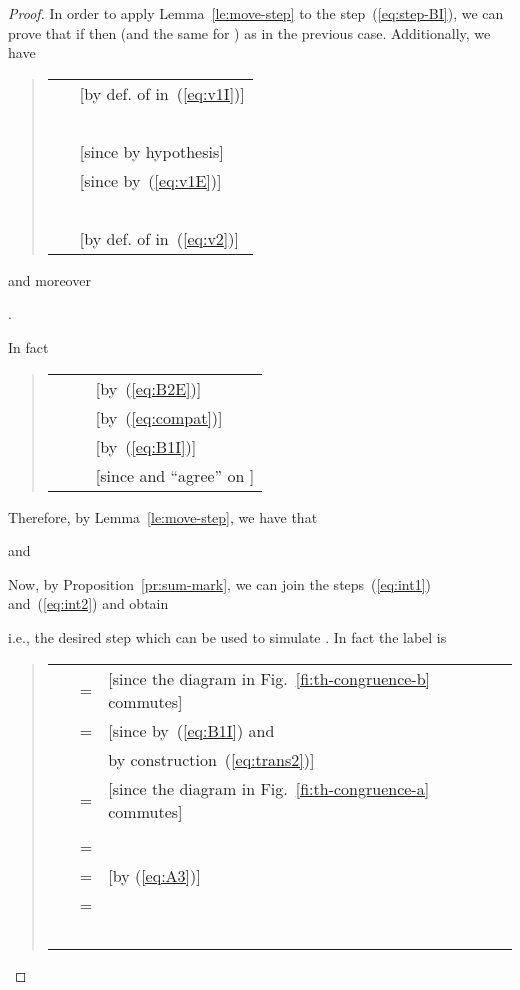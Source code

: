 \documentclass{LMCS}
\begin{document}
\begin{proof}
  
  In order to apply Lemma~\ref{le:move-step} to the
  step~(\ref{eq:step-BI}), we can prove that if  then
   (and the same for ) as in the previous case.
Additionally, we have
  \begin{quote}
    \begin{tabular}{ll}
       & 
      [by def. of  in~(\ref{eq:v1I})]\\
\ \quad  & \\
\ \quad  &
      [since   by hypothesis]\\
\ \quad  &
      [since   by~(\ref{eq:v1E})]\\
\ \quad  &\\
\ \quad  &
      [by def. of  in~(\ref{eq:v2})]
    \end{tabular}
  \end{quote}
  and moreover
  \begin{center}
    .
  \end{center}
  In fact
  \begin{quote}
    \begin{tabular}{lll}
       & & 
      [by~(\ref{eq:B2E})]\\
\ \quad  & &
      [by~(\ref{eq:compat})]\\
\ \quad  & &
      [by~(\ref{eq:B1I})]\\
\ \quad  & &
      [since  and  ``agree'' on  ]\\
\end{tabular}
  \end{quote}
  
\noindent
  Therefore, by Lemma~\ref{le:move-step}, we have that 
  
  and
  
 
  \bigskip
\noindent
  Now, by Proposition~\ref{pr:sum-mark}, we can join the
  steps~(\ref{eq:int1}) and~(\ref{eq:int2}) and obtain
  \begin{center}
    
  \end{center}
  i.e., the desired step which can be used to simulate . In fact the label is
  \begin{quote}
    \begin{tabular}{ll}
      \\
\ \ \ =  & [since the diagram in Fig.~\ref{fi:th-congruence-b} commutes]\\
\ \ \ =  &  
      [since  by~(\ref{eq:B1I})  and\\
      & \phantom{[} by construction~(\ref{eq:trans2})]\\
\ \ \ =  &  
       [since the diagram in Fig.~\ref{fi:th-congruence-a} commutes]\\\\
\ \ \ = \\
\ \ \ =  &  [by (\ref{eq:A3})]\\
\ \ \ = \\
\ \ \ 
    \end{tabular}
  \end{quote}
  

\end{proof}
\end{document}
